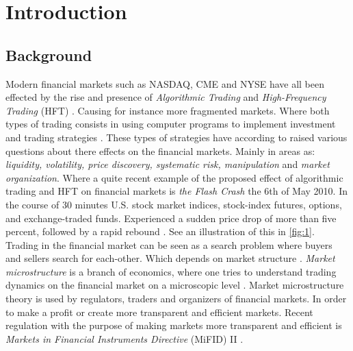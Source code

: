 \documentclass{kththesis}
\theoremstyle{definition}
\begin{document}
\clearpage

\tableofcontents

\listoffigures
 
\listoftables

\lstlistoflistings


\mainmatter


\chapter{Introduction}\label{ch:1}


\section{Background}
Modern financial markets such as NASDAQ, CME and NYSE have all been effected by the rise and presence of \textit{Algorithmic Trading} and \textit{High-Frequency Trading} (HFT) \parencite{abrol2016high}. Causing for instance more fragmented markets. Where both types of trading consists in using computer programs to implement investment and trading strategies \parencite{abergel2012market}. These types of strategies have according to \textcite{abergel2012market, o2015high} raised various questions about there effects on the financial markets. Mainly in areas as: \textit{liquidity, volatility, price discovery, systematic risk, manipulation} and \textit{market organization}. Where a quite recent example of the proposed effect of algorithmic trading and HFT on financial markets is \textit{the Flash Crash} the 6th of May 2010. In the course of 30 minutes U.S. stock market indices, stock-index futures, options, and exchange-traded funds. Experienced a sudden price drop of more than five percent, followed by a rapid rebound \parencite{kirilenko2011flash,kirilenko2017flash}. See an illustration of this in \autoref{fig:1}.
\newline
\newline
Trading in the financial market can be seen as a search problem where buyers and sellers search for each-other. Which depends on market structure \parencite{abergel2012market}. \textit{Market microstructure} is a branch of economics, where one tries to understand trading dynamics on the financial market on a microscopic level \parencite{o1995market, hasbrouck2007empirical}. Market microstructure theory is used by regulators, traders and organizers of financial markets. In order to make a profit or create more transparent and efficient markets. Recent regulation with the purpose of making markets more transparent and efficient is \textit{Markets in Financial Instruments Directive} (MiFID) II \parencite{busch2016mifid}.
\end{document}
